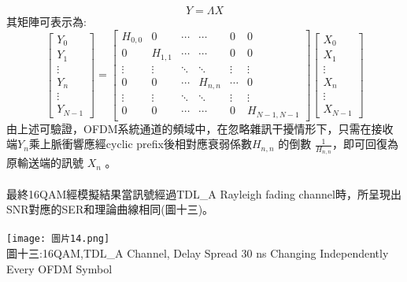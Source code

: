 \documentclass[12pt,a4paper]{article} %
\begin{document}
\[Y=\Lambda X\]
其矩陣可表示為:
\[
\begin{bmatrix}
Y_0 \\
Y_1 \\
\vdots \\
Y_n \\
\vdots \\
Y_{N-1}
\end{bmatrix}
=
\begin{bmatrix}
H_{0,0} & 0 & \cdots & \cdots & 0 & 0 \\
0 & H_{1,1} & \cdots & \cdots & 0 & 0 \\
\vdots & \vdots & \ddots & \ddots & \vdots & \vdots \\
0 & 0 & \cdots & H_{n,n} & \cdots & 0 \\
\vdots & \vdots & \ddots & \ddots & \vdots & \vdots \\
0 & 0 & \cdots & \cdots & 0 & H_{N-1,N-1}
\end{bmatrix}
\begin{bmatrix}
X_0 \\
X_1 \\
\vdots \\
X_n \\
\vdots \\
X_{N-1}
\end{bmatrix}
\]
由上述可驗證，OFDM系統通道的頻域中，在忽略雜訊干擾情形下，只需在接收端$Y_n$乘上脈衝響應經cyclic prefix後相對應衰弱係數$H_{n,n}$ 的倒數  $\frac{1} {H_{n,n}}$，即可回復為原輸送端的訊號 $X_n$ 。\\
\\
最終16QAM經模擬結果當訊號經過TDL\_A Rayleigh fading channel時，所呈現出SNR對應的SER和理論曲線相同(圖十三)。\\
\\
\texttt{[image: 圖片14.png]}\\
圖十三:16QAM,TDL\_A Channel, Delay Spread 30 ns Changing Independently Every OFDM Symbol \\

\newpage
\nocite{*}
\printbibliography
\end{document}
